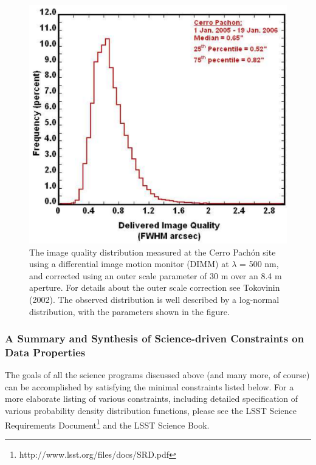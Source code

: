 \begin{figure}
\includegraphics[width=1.0\hsize,clip]{seeing2.pdf}
\caption{
The image quality distribution measured at the Cerro Pach\'{o}n site using
a differential image motion monitor (DIMM) at $\lambda$ = 500 nm, and corrected
using an outer scale parameter of 30 m over an 8.4 m aperture. For details
about the outer scale correction see Tokovinin (2002). The observed distribution
is well described by a log-normal distribution, with the parameters shown in
the figure.}
\label{Fig:seeing}
\end{figure}

\subsubsection{A Summary and Synthesis of Science-driven Constraints on Data Properties}

The goals of all the science programs discussed above
(and many more, of course) can be accomplished by satisfying the
minimal constraints listed below. For a more elaborate listing
of various constraints, including detailed specification of
various probability density distribution functions, please see the LSST Science
Requirements Document\footnote{http://www.lsst.org/files/docs/SRD.pdf}
and the LSST Science Book.

